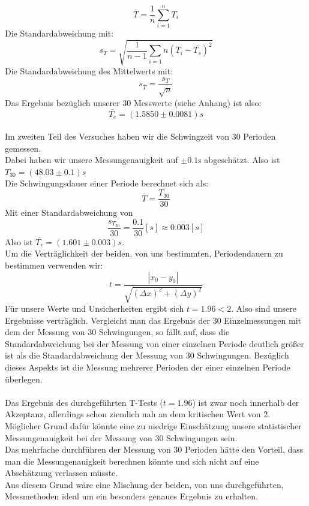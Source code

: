 \documentclass[11pt,a4paper]{article}
\begin{document}
	\begin{equation}
	\bar{T} = \frac{1}{n} \sum_{i=1}^{n} T_i
	\end{equation}
	Die Standardabweichung mit:
	\begin{equation}
	s_T=\sqrt{\frac{1}{n-1}\sum_{i=1}{n} (T_i - \bar{T_s})^2}
	\end{equation}
	Die Standardabweichung des Mittelwerts mit:
	\begin{equation}
	s_{\bar{T}}=\frac{s_T}{\sqrt{n}}
	\end{equation}
	Das Ergebnis bezüglich unserer 30 Messwerte (siehe Anhang) ist also:
	\begin{equation*}
	\bar{T_e}=(1.5850 \pm 0.0081)s
	\end{equation*}
	\\ \newpage
	Im zweiten Teil des Versuches haben wir die Schwingzeit von 30 Perioden gemessen. \\
	Dabei haben wir unsere Messungenauigkeit auf $\pm 0.1$s abgeschätzt. Also ist $T_{30}=(48.03\pm 0.1)s$
	\\
	Die Schwingungsdauer einer Periode berechnet sich als:
	\begin{equation*}
	\bar{T}=\frac{T_{30}}{30}
	\end{equation*}
	Mit einer Standardabweichung von $$\frac{s_{T_{30}}}{30}=\frac{0.1}{30}[s]\approx 0.003[s]$$
	Also ist $\bar{T_r}=(1.601\pm 0.003)s$. \\
	Um die Verträglichkeit der beiden, von uns bestimmten, Periodendauern zu bestimmen verwenden wir:
	\begin{equation}
	t=\frac{ |x_0 -y_0|}{\sqrt{(\Delta x)^2 + (\Delta y)^2}}
	\end{equation}
	Für unsere Werte und Unsicherheiten ergibt sich $t=1.96<2$. Also sind unsere Ergebnisse verträglich.
	\newpage
	Vergleicht man das Ergebnis der 30 Einzelmessungen mit dem der Messung von 30 Schwingungen,
	so fällt auf, dass die Standardabweichung bei der Messung von einer einzelnen Periode deutlich
	größer ist als die Standardabweichung der Messung von 30 Schwingungen.
	Bezüglich dieses Aspekts ist die Messung mehrerer Perioden der einer einzelnen Periode überlegen.
	\\
	\\
	Das Ergebnis des durchgeführten T-Tests ($t=1.96$) ist zwar noch innerhalb der Akzeptanz, allerdings schon
	ziemlich nah an dem kritischen Wert von 2.
	Möglicher Grund dafür könnte eine zu niedrige Einschätzung unsere statistischer Messungenauigkeit bei der Messung von 30 Schwingungen sein.
	\\Das mehrfache durchführen der Messung von 30 Perioden hätte den Vorteil, dass man die Messungenauigkeit berechnen könnte und sich nicht auf eine Abschätzung verlassen müsste.
	\\
	Aus diesem Grund wäre eine Mischung der beiden, von uns durchgeführten, Messmethoden ideal um ein
	besonders genaues Ergebnis zu erhalten.
\end{document}
